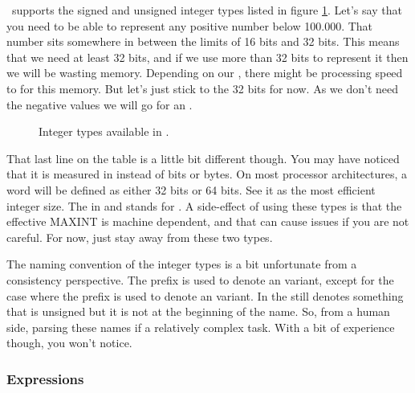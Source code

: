\csharp\ supports the signed and unsigned integer types listed in figure \ref{fig:prim:int:csharp:types}. Let's say that you need to be able to represent any positive number below 100.000. That number sits somewhere in between the limits of 16 bits and 32 bits. This means that we need at least 32 bits, and if we use more than 32 bits to represent it then we will be wasting memory. Depending on our , there might be processing speed to  for this  memory. But let's just stick to the 32 bits for now. As we don't need the negative values we will go for an .

\begin{figure}[tbp]
  
  \caption{Integer types available in \csharp.}
  \label{fig:prim:int:csharp:types}
\end{figure}

That last line on the table is a little bit different though. You may have noticed that it is measured in  instead of bits or bytes. On most processor architectures, a word will be defined as either 32 bits or 64 bits. See it as the most efficient integer size. The  in  and  stands for \textsl{}. A side-effect of using these types is that the effective MAXINT is machine dependent, and that can cause  issues if you are not careful. For now, just stay away from these two types.

The naming convention of the integer types is a bit unfortunate from a consistency perspective. The  prefix is used to denote an  variant, except for the  case where the  prefix is used to denote an  variant. In  the  still denotes something that is unsigned but it is not at the beginning of the name. So, from a human side, parsing these names if a relatively complex task. With a bit of experience though, you won't notice.


\subsubsection{Expressions}

